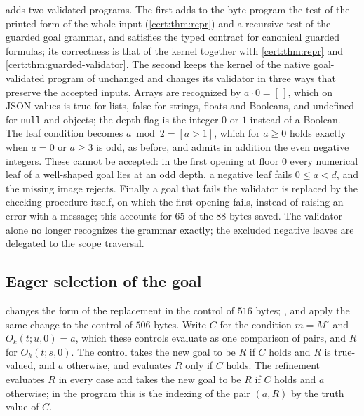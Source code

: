 \begin{remark}\label{cert:rem:retained-validated}
 adds two validated programs. The first adds to the
byte program the test of the printed form of the whole input
(\cref{cert:thm:repr}) and a recursive test of the guarded goal grammar,
and satisfies the typed contract for canonical guarded formulas; its
correctness is that of the kernel together with \cref{cert:thm:repr} and
\cref{cert:thm:guarded-validator}. The second keeps the kernel of the native
goal-validated program of  unchanged and changes its
validator in three ways that preserve the accepted inputs. Arrays are
recognized by $a\cdot 0=[\,]$, which on JSON values is true for lists, false
for strings, floats and Booleans, and undefined for \texttt{null} and objects;
the depth flag is the integer $0$ or $1$ instead of a Boolean. The leaf
condition becomes $a\bmod 2=[a>1]$, which for $a\ge0$ holds exactly when $a=0$
or $a\ge3$ is odd, as before, and admits in addition the even negative
integers. These cannot be accepted: in the first opening at floor $0$ every
numerical leaf of a well-shaped goal lies at an odd depth, a negative leaf
fails $0\le a<d$, and the missing image rejects. Finally a goal that fails
the validator is replaced by the checking procedure itself, on which the
first opening fails, instead of raising an error with a message; this
accounts for $65$ of the $88$ bytes saved. The validator alone no longer
recognizes the grammar exactly; the excluded negative leaves are delegated to
the scope traversal.
\end{remark}

\subsection{Eager selection of the goal}

 changes the form of the replacement in the control of
$516$ bytes; ,  and
 apply the same change to the control of $506$
bytes. Write $C$ for the condition $m=M^{\circ}$ and $O_k(t;u,0)=a$, which
these controls evaluate as one comparison of pairs, and $R$ for
$O_k(t;s,0)$. The control takes the new goal to be $R$ if $C$ holds and $R$
is true-valued, and $a$ otherwise, and evaluates $R$ only if $C$ holds. The
refinement evaluates $R$ in every case and takes the new goal to be $R$ if
$C$ holds and $a$ otherwise; in the program this is the indexing of the pair
$(a,R)$ by the truth value of $C$.

